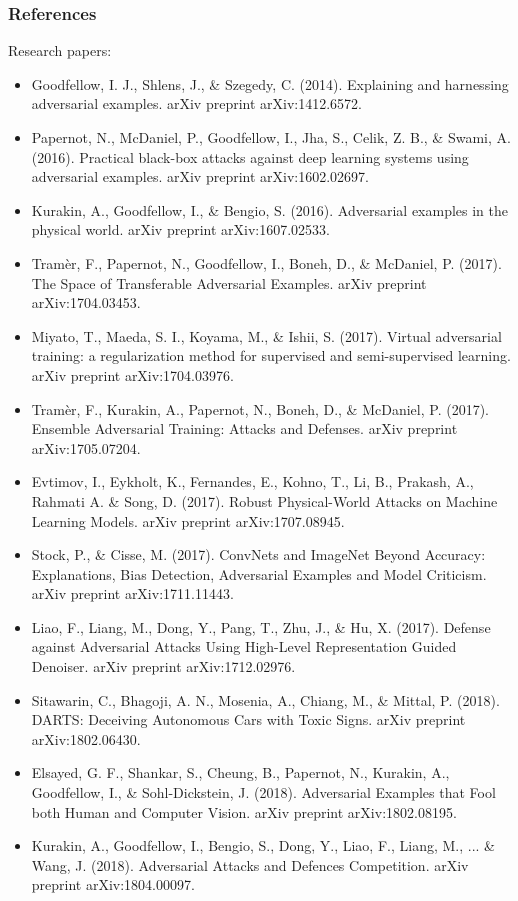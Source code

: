 \documentclass[9pt]{beamer}
\begin{document}
\begin{frame}
  \frametitle{References}

  Research papers:
  {\tiny
    \begin{itemize}
    \item Goodfellow, I. J., Shlens, J., \& Szegedy,
      C. (2014). Explaining and harnessing adversarial
      examples. arXiv preprint arXiv:1412.6572.
    \item Papernot, N., McDaniel, P., Goodfellow, I., Jha, S., Celik,
      Z. B., \& Swami, A. (2016). Practical black-box attacks against
      deep learning systems using adversarial examples. arXiv preprint
      arXiv:1602.02697.
    \item Kurakin, A., Goodfellow, I., \& Bengio,
      S. (2016). Adversarial examples in the physical world. arXiv
      preprint arXiv:1607.02533.
    \item Tramèr, F., Papernot, N., Goodfellow, I., Boneh, D., \&
      McDaniel, P. (2017). The Space of Transferable Adversarial
      Examples. arXiv preprint arXiv:1704.03453.
    \item Miyato, T., Maeda, S. I., Koyama, M., \& Ishii,
      S. (2017). Virtual adversarial training: a regularization method
      for supervised and semi-supervised learning. arXiv preprint
      arXiv:1704.03976.
    \item Tramèr, F., Kurakin, A., Papernot, N., Boneh, D., \&
      McDaniel, P. (2017). Ensemble Adversarial Training: Attacks and
      Defenses. arXiv preprint arXiv:1705.07204.
    \item Evtimov, I., Eykholt, K., Fernandes, E., Kohno, T., Li, B.,
      Prakash, A., Rahmati A. \& Song, D. (2017). Robust Physical-World
      Attacks on Machine Learning Models. arXiv preprint
      arXiv:1707.08945.
    \item Stock, P., \& Cisse, M. (2017). ConvNets and ImageNet Beyond
      Accuracy: Explanations, Bias Detection, Adversarial Examples and
      Model Criticism. arXiv preprint arXiv:1711.11443.
    \item Liao, F., Liang, M., Dong, Y., Pang, T., Zhu, J., \& Hu,
      X. (2017). Defense against Adversarial Attacks Using High-Level
      Representation Guided Denoiser. arXiv preprint arXiv:1712.02976.
    \item Sitawarin, C., Bhagoji, A. N., Mosenia, A., Chiang, M., \&
      Mittal, P. (2018). DARTS: Deceiving Autonomous Cars with Toxic
      Signs. arXiv preprint arXiv:1802.06430.
    \item Elsayed, G. F., Shankar, S., Cheung, B., Papernot, N.,
      Kurakin, A., Goodfellow, I., \& Sohl-Dickstein,
      J. (2018). Adversarial Examples that Fool both Human and
      Computer Vision. arXiv preprint arXiv:1802.08195.
    \item Kurakin, A., Goodfellow, I., Bengio, S., Dong, Y., Liao, F.,
      Liang, M., ... \& Wang, J. (2018). Adversarial Attacks and
      Defences Competition. arXiv preprint
      arXiv:1804.00097.
    \end{itemize}
  }


\end{frame}
\end{document}
